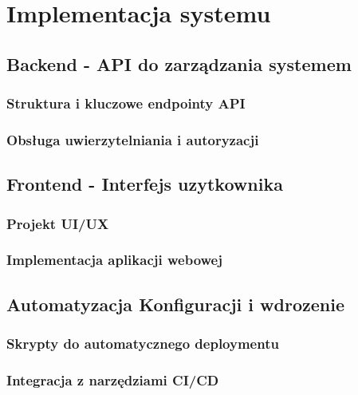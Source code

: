 \chapter{Implementacja systemu}

\section{Backend - API do zarządzania systemem}

\subsection{Struktura i kluczowe endpointy API}

\subsection{Obsługa uwierzytelniania i autoryzacji}

\section{Frontend - Interfejs uzytkownika}

\subsection{Projekt UI/UX}

\subsection{Implementacja aplikacji webowej}

\section{Automatyzacja Konfiguracji i wdrozenie}

\subsection{Skrypty do automatycznego deploymentu}

\subsection{Integracja z narzędziami CI/CD}